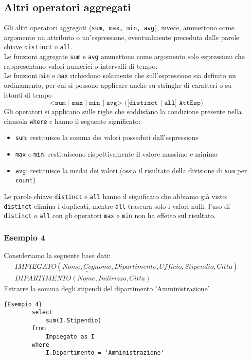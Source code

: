 \subsection{Altri operatori aggregati}
Gli altri operatori aggregati (\texttt{sum, max, min, avg}), invece, ammettono come argomento un attributo o un'espressione, eventualmente preceduta dalle parole chiave \texttt{distinct} o \texttt{all}.\\
Le funzioni aggregate \texttt{sum} e \texttt{avg} ammettono come argomento solo espressioni che rappresentano valori numerici o intervalli di tempo.\\
Le funzioni \texttt{min} e \texttt{max} richiedono solamente che sull'espressione sia definito un ordinamento, per cui si possono applicare anche su stringhe di caratteri o su istanti di tempo
	$$\texttt{<sum | max | min | avg> ([distinct | all] AttEsp)}$$
Gli operatori si applicano sulle righe che soddisfano la condizione presente nella clausola \texttt{where} e hanno il seguente significato:
	\begin{itemize}
		\item{\texttt{sum}: restituisce la somma dei valori posseduti dall'espressione}
		\item {\texttt{max} e \texttt{min}: restituiscono rispettivamente il valore massimo e minimo}
		\item {\texttt{avg}: restituisce la medai dei valori (ossia il risultato della divisione di \texttt{sum} per \texttt{count})}
	\end{itemize}
Le parole chiave \texttt{distinct} e \texttt{all} hanno il significato che abbiamo già visto: \texttt{distinct} elimina i duplicati, mentre \texttt{all} trascura solo i valori nulli; l'uso di \texttt{distinct} o \texttt{all} con gli operatori \texttt{max} e \texttt{min} non ha effetto sul risultato.

\subsubsection{Esempio 4}
Consideriamo la seguente base dati:
	\begin{equation}\begin{aligned}
		IMPIEGATO (\underline{Nome, Cognome}, Dipartimento, Ufficio, Stipendio, Citta)\\
		DIPARTIMENTO (\underline{Nome}, Indirizzo, Citta)
	\end{aligned}\end{equation}
Estrarre la somma degli stipendi del dipartimento 'Amministrazione'
	\begin{lstlisting}{Esempio 4}
		select 
			sum(I.Stipendio)
		from 
			Impiegato as I
		where
			I.Dipartimento = 'Amministrazione'
	\end{lstlisting}
	


